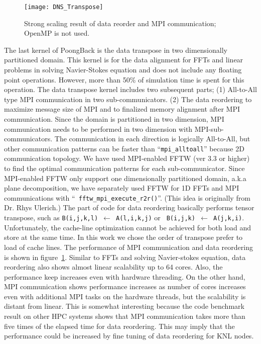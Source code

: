 \begin{figure}
 \begin{center}
   \texttt{[image: DNS\_Transpose]}
   \caption{Strong scaling result of data reorder and MPI communication; OpenMP is not used.}
   \label{fig:DNS_strong_scale_transpose}
 \end{center}
\end{figure}

The last kernel of PoongBack is the data transpose in two dimensionally
partitioned domain. This kernel is for the data alignment for FFTs and
linear problems in solving Navier-Stokes equation and does not include
any floating point operations. However, more than 50\% of simulation
time is spent for this operation. The data transpose kernel includes two
subsequent parts; (1) All-to-All type MPI communication in two
sub-communicators. (2) The data reordering to maximize message size of
MPI and to finalized memory alignment after MPI communication. Since the
domain is partitioned in two dimension, MPI communication needs to be
performed in two dimension with MPI-sub-communicators. The communication
in each direction is logically All-to-All, but other communication
patterns can be faster than ``{\tt mpi\_alltoall}'' because 2D
communication topology. We have used MPI-enabled FFTW (ver 3.3 or
higher) to find the optimal communication patterns for each
sub-communicator. Since MPI-enabled FFTW only support one dimensionally
partitioned domain, a.k.a plane decomposition, we have separately used
FFTW for 1D FFTs and MPI communications with ``{\tt
fftw\_mpi\_execute\_r2r()}''. (This idea is originally from Dr. Rhys
Ulerich.) The part of code for data reordering basically performs tensor
transpose, such as {\tt B(i,j,k,l) $\leftarrow$ A(l,i,k,j)} or {\tt
B(i,j,k) $\leftarrow$ A(j,k,i)}. Unfortunately, the cache-line
optimization cannot be achieved for both load and store at the same
time. In this work we chose the order of transpose prefer to load of
cache lines. The performance of MPI communication and data reordering is
shown in figure~\ref{fig:DNS_strong_scale_transpose}. Similar to FFTs
and solving Navier-stokes equation, data reordering also shows almost
linear scalability up to 64 cores. Also, the performance keep increases
even with hardware threading. On the other hand, MPI communication shows
performance increases as number of cores increases even with additional
MPI tasks on the hardware threads, but the scalability is distant from
linear. This is somewhat interesting because the code benchmark result
on other HPC systems shows that MPI communication takes more than five
times of the elapsed time for data reordering. \cite{Lee:2013kv} This
may imply that the performance could be increased by fine tuning of data
reordering for KNL nodes. 

